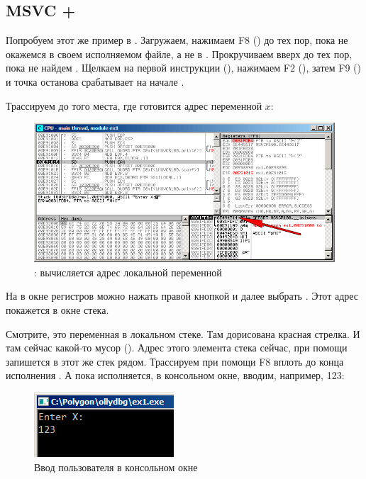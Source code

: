 \clearpage
\subsection{MSVC + \olly}
\myindex{\olly}

Попробуем этот же пример в \olly.
Загружаем, нажимаем F8 (\stepover) до тех пор, пока не окажемся в своем исполняемом файле,
а не в .
Прокручиваем вверх до тех пор, пока не найдем \main.
Щелкаем на первой инструкции (), нажимаем F2 (), 
затем F9 () и точка останова срабатывает на начале \main.

Трассируем до того места, где готовится адрес переменной $x$:

\begin{figure}[H]
\centering
\includegraphics[scale=\FigScale]{patterns/04_scanf/1_simple/ex1_olly_1.png}
\caption{\olly: вычисляется адрес локальной переменной}
\label{fig:scanf_ex1_olly_1}
\end{figure}

На \EAX в окне регистров можно нажать правой кнопкой и далее выбрать .
Этот адрес покажется в окне стека.

Смотрите, это переменная в локальном стеке. Там дорисована красная стрелка.
И там сейчас какой-то мусор ().
Адрес этого элемента стека сейчас, при помощи \PUSH запишется в этот же стек рядом.
Трассируем при помощи F8 вплоть до конца исполнения \scanf.
А пока \scanf исполняется, в консольном окне, вводим, например, 123:

\begin{figure}[H]
\centering
\includegraphics[scale=\NormalScale]{patterns/04_scanf/1_simple/ex1_olly_2.png}
\caption{Ввод пользователя в консольном окне}
\label{fig:scanf_ex1_olly_2}
\end{figure}

